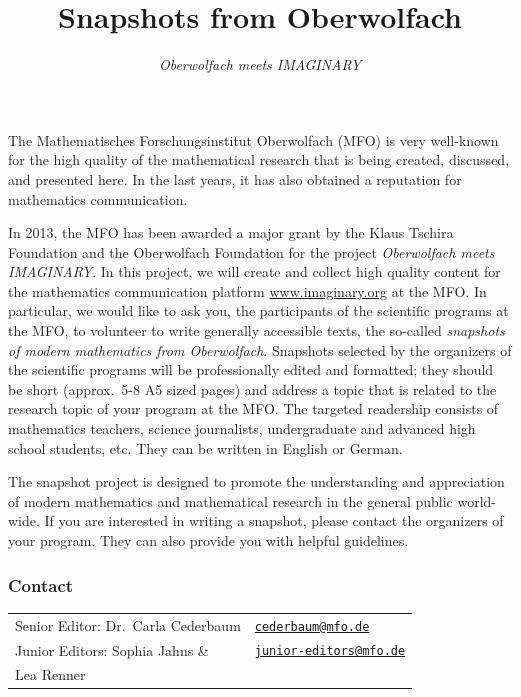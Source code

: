 \documentclass[a4paper,12pt]{article}
\title{Snapshots from Oberwolfach}
\date{}
\author{\it Oberwolfach meets IMAGINARY}
\begin{document}
\maketitle
\thispagestyle{fancy}
\afterpage{\chead{\thepage}}

The Mathematisches Forschungsinstitut Oberwolfach (MFO) is very well-known for the high quality of the mathematical research that is being created, discussed, and presented here. In the last years, it has also obtained a reputation for mathematics communication.

In 2013, the MFO has been awarded a major grant by the Klaus Tschira Foundation and the Oberwolfach Foundation for the project {\it Oberwolfach meets IMAGINARY}. In this project, we will create and collect high quality content for the mathematics communication platform \url{www.imaginary.org} at the MFO. In particular, we would like to ask you, the participants of the scientific programs at the MFO, to volunteer to write generally accessible texts, the so-called {\it snapshots of modern mathematics from Oberwolfach}. Snapshots selected by the organizers of the scientific programs will be professionally edited and formatted; they should be short (approx.\ 5-8 A5 sized pages) and address a topic that is related to the research topic of your program at the MFO. The targeted readership consists of mathematics teachers, science journalists, undergraduate and advanced high school students, etc. They can be written in English or German.

The snapshot project is designed to promote the understanding and appreciation of modern mathematics and mathematical research in the general public world-wide. If you are interested in writing a snapshot, please contact the organizers of your program. They can also provide you with helpful guidelines.\\

\subsubsection*{Contact}%
\begin{tabular}{@{}ll@{}}
Senior Editor:\phantom{s} Dr.~Carla Cederbaum &\href{mailto:cederbaum@mfo.de}{\nolinkurl{cederbaum@mfo.de} }\\
Junior Editors: Sophia Jahns \& &\href{mailto:junior-editors@mfo.de}{\nolinkurl{junior-editors@mfo.de} }\\
\phantom{Junior Editors: }Lea Renner
\end{tabular}
\pagebreak
\end{document}
